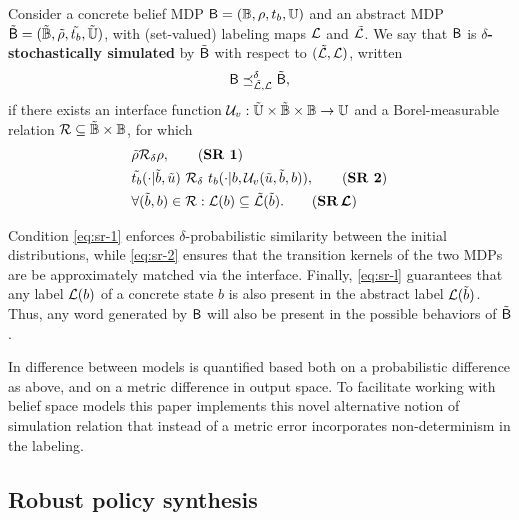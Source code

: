 \documentclass{ifacconf}
\begin{document}
\begin{definition}
\label{def:apbsim}
Consider a concrete belief MDP $\mathsf{B} = (\mathbb{B}, \rho, t_b, {\mathbb{U}})$ and an abstract MDP $\tilde{\mathsf{B}} = (\tilde {\mathbb{B}}, \tilde \rho, \tilde {t_b}, \tilde {{\mathbb{U}}})$, with (set-valued) labeling maps $\mathcal{L}$ and  $\tilde{\mathcal{L}}$. We say that	$\mathsf{B}$ is \textbf{$\delta$-stochastically simulated} by $\tilde {\mathsf{B}}$ with respect to $(\tilde{\mathcal{L}},\mathcal{L})$, written
\begin{equation}
  {\mathsf{B}}\preceq^{\delta}_{\tilde{\mathcal{L}},\mathcal{L}} \tilde {\mathsf{B}},
\end{equation}
if there exists an interface function $\mathcal{U}_{v} : \tilde {{\mathbb{U}}} \times \tilde {\mathbb{B}} \times \mathbb{B} \rightarrow {\mathbb{U}}$ and a Borel-measurable relation $\mathcal{R}\subseteq \tilde {\mathbb{B}}\times \mathbb{B}$, for which
\begin{align}
  \label{eq:sr-1} & \tilde\init \bar \rel_\delta \init, \tag{\textbf{SR 1}} \\
  \label{eq:sr-2} & \tilde \trb(\cdot| \tilde b, \tilde u)\ \bar \rel_\delta \  \trb(\cdot| b, \InF(\tilde u,\tilde b,b)), \tag{\textbf{SR 2}} \\
  \label{eq:sr-l} & \forall (\tilde b,b)\in \rel:  \Labset(b)\subseteq \tilde{\Labset}(\tilde b). \tag{\textbf{SR$\,\boldsymbol{\CA{L}}$}}
\end{align}
\end{definition}

Condition \eqref{eq:sr-1} enforces $\delta$-probabilistic similarity between the initial distributions, while \eqref{eq:sr-2} ensures that the transition kernels of the two MDPs are be approximately matched via the interface. Finally, \eqref{eq:sr-l} guarantees that any label $\mathcal{L}(b)$ of a concrete state $b$ is also present in the abstract label $\mathcal{L}(\tilde b)$. Thus, any word generated by $\mathsf{B}$ will also be present in the possible behaviors of $\tilde {\mathsf{B}}$.

In \citet{haesaert2017verification} difference between models is quantified based both on a probabilistic difference as above, and on a metric difference in output space. To facilitate working with belief space models this paper implements this novel alternative notion of simulation relation that instead of a metric error incorporates non-determinism in the labeling.


\subsection{Robust policy synthesis}
\end{document}
